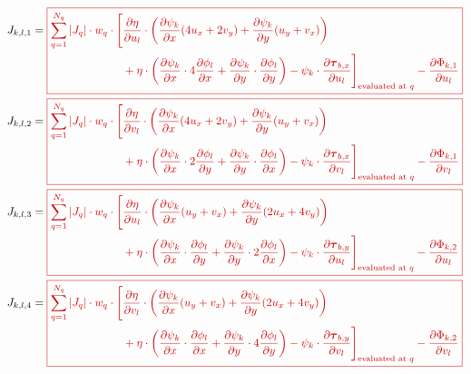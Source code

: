 \documentclass{amsart}
\newcommand{\T}{\boldsymbol{\tau}}
\newcommand{\diff}[2]{\ensuremath{\frac{\partial #1}{\partial #2}}}
\newcommand{\sumQ}{\ensuremath{\sum_{q = 1}^{N_q}}}
\newcommand{\basalshearstress}[1]{\T_{b#1}}
\newcommand{\taubx}{\basalshearstress{,x}}
\newcommand{\tauby}{\basalshearstress{,y}}
\newcommand{\highlight}[1]{{\color{red!80!black} \fbox{$ \displaystyle #1 $} }}
\begin{document}
\begin{align}
  J_{k,l,1} &= \highlight{
              \begin{aligned}[t]
                \sumQ |J_q| \cdot w_q\cdot \Bigg[&\diff{\eta}{u_l}\cdot
                \left( \diff{\psi_k}{x} (4 u_x + 2 v_y) + \diff{\psi_k}{y} (u_y + v_x) \right)\\
                & + \eta\cdot \left( \diff{\psi_k}{x}\cdot 4 \diff{\phi_l}{x} + \diff{\psi_k}{y}\cdot \diff{\phi_l}{y} \right)
                - \psi_k\cdot \diff{\taubx}{u_l} \Bigg]_{\text{evaluated at } q} - \diff{\Phi_{k,1}}{u_{l}}\\
              \end{aligned} }\\
  J_{k,l,2} &= \highlight{
              \begin{aligned}[t]
                \sumQ |J_q| \cdot w_q\cdot \Bigg[&\diff{\eta}{v_l}\cdot
                \left( \diff{\psi_k}{x} (4 u_x + 2 v_y) + \diff{\psi_k}{y} (u_y + v_x) \right)\\
                & + \eta\cdot \left( \diff{\psi_k}{x}\cdot 2 \diff{\phi_l}{y} + \diff{\psi_k}{y}\cdot \diff{\phi_l}{x} \right)
                - \psi_k\cdot \diff{\taubx}{v_l} \Bigg]_{\text{evaluated at } q} - \diff{\Phi_{k,1}}{v_{l}}\\
              \end{aligned} }\\
  J_{k,l,3} &= \highlight{
              \begin{aligned}[t]
                \sumQ |J_q| \cdot w_q\cdot \Bigg[&\diff{\eta}{u_l}\cdot
                \left( \diff{\psi_k}{x} (u_y + v_x) + \diff{\psi_k}{y} (2 u_x + 4 v_y) \right)\\
                & + \eta\cdot \left( \diff{\psi_k}{x}\cdot \diff{\phi_l}{y} + \diff{\psi_k}{y}\cdot 2 \diff{\phi_l}{x} \right)
                - \psi_k\cdot \diff{\tauby}{u_l} \Bigg]_{\text{evaluated at } q} - \diff{\Phi_{k,2}}{u_{l}}\\
              \end{aligned} }\\
  J_{k,l,4} &= \highlight{
              \begin{aligned}[t]
                \sumQ |J_q| \cdot w_q\cdot \Bigg[&\diff{\eta}{v_l}\cdot
                \left( \diff{\psi_k}{x} (u_y + v_x) + \diff{\psi_k}{y} (2 u_x + 4 v_y) \right)\\
                & + \eta\cdot \left( \diff{\psi_k}{x}\cdot \diff{\phi_l}{x} + \diff{\psi_k}{y}\cdot 4 \diff{\phi_l}{y} \right)
                - \psi_k\cdot \diff{\tauby}{v_l} \Bigg]_{\text{evaluated at } q} - \diff{\Phi_{k,2}}{v_{l}}\\
              \end{aligned} }
\end{align}
\end{document}
